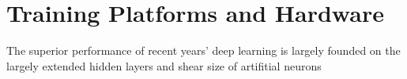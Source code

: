 \section{Training Platforms and Hardware}
The superior performance of recent years' deep learning is largely founded on the largely extended hidden layers and shear size of artifitial neurons